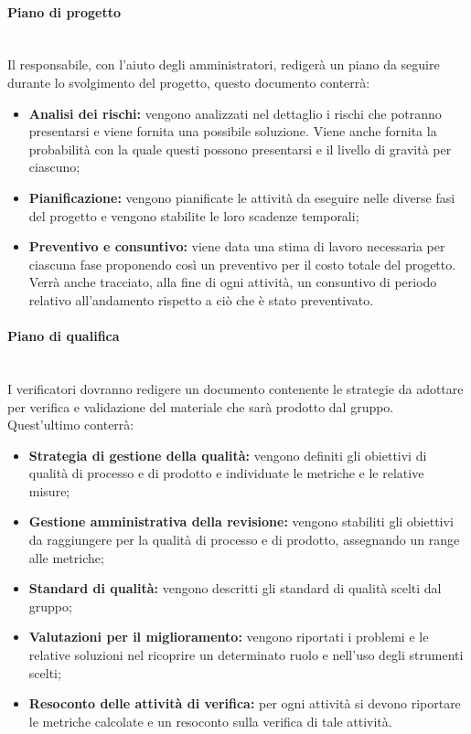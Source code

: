 \paragraph{Piano di progetto} \mbox{}\\
Il responsabile, con l'aiuto degli amministratori, redigerà un piano da seguire durante lo svolgimento del progetto, questo documento conterrà:
\begin{itemize}
	\item \textbf{Analisi dei rischi:} vengono analizzati nel dettaglio i rischi che potranno presentarsi e viene fornita una possibile soluzione. Viene anche fornita la probabilità con la quale questi possono presentarsi e il livello di gravità per ciascuno;
	\item \textbf{Pianificazione:} vengono pianificate le attività da eseguire nelle diverse fasi del progetto e vengono stabilite le loro scadenze temporali;
	\item \textbf{Preventivo e consuntivo:} viene data una stima di lavoro necessaria per ciascuna fase proponendo così un preventivo per il costo totale del progetto. Verrà anche tracciato, alla fine di ogni attività, un consuntivo di periodo relativo all'andamento rispetto a ciò che è stato preventivato.
\end{itemize}
\paragraph{Piano di qualifica} \mbox{}\\
I verificatori dovranno redigere un documento contenente le strategie da adottare per verifica e validazione del materiale che sarà prodotto dal gruppo. Quest'ultimo conterrà:
\begin{itemize}
	\item \textbf{Strategia di gestione della qualità:} vengono definiti gli obiettivi di qualità di processo e di prodotto e individuate le metriche e le relative misure;
	\item \textbf{Gestione amministrativa della revisione:} vengono stabiliti gli obiettivi da raggiungere per la qualità di processo e di prodotto, assegnando un range alle metriche;
	\item \textbf{Standard di qualità:} vengono descritti gli standard di qualità scelti dal gruppo;
	\item \textbf{Valutazioni per il miglioramento:} vengono riportati i problemi e le relative soluzioni nel ricoprire un determinato ruolo e nell'uso degli strumenti scelti;
	\item \textbf{Resoconto delle attività di verifica:} per ogni attività si devono riportare le metriche calcolate e un resoconto sulla verifica di tale attività.
\end{itemize}

